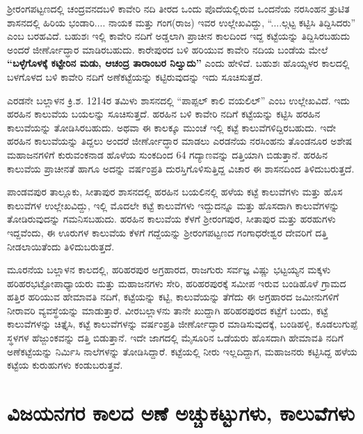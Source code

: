 ಶ‍್ರೀರಂಗಪಟ್ಟಣದಲ್ಲಿ ಚಂದ್ರವನದಬಳಿ ಕಾವೇರಿ ನದಿ ತೀರದ ಒಂದು ಪೊದೆಯಲ್ಲಿರುವ ಒಂದನೆಯ ನರಸಿಂಹನ ತ್ರುಟಿತ ಶಾಸನದಲ್ಲಿ ಹಿರಿಯ ಭಂಡಾರಿ.... ನಾಯಕ ಮತ್ತು ಗಂಗ(ರಾಜ) ಇವರ ಉಲ್ಲೇಖವಿದ್ದು, “....ಲ್ಗಟ್ಟ ಕಟ್ಟಿಸಿ ತಿದ್ದಿಸಿದರು” ಎಂಬ ಬರಹವಿದೆ. ಬಹುಶಃ ಇಲ್ಲಿ ಕಾವೇರಿ ನದಿಗೆ ಅಡ್ಡಲಾಗಿ ಪ್ರಾಚೀನ ಕಾಲದಿಂದ ಇದ್ದ ಕಟ್ಟೆಯನ್ನು ತಿದ್ದಿಸಿರಬಹುದು ಅಂದರೆ ಜೀರ್ಣೋದ್ಧಾರ ಮಾಡಿರಬಹುದು. ಕಾರೇಪುರದ ಬಳಿ ಹರಿಯುವ ಕಾವೇರಿ ನದಿಯ ಬಂಡೆಯ ಮೇಲೆ \textbf{“ಬಳ್ಳೆಗೊಳಕ್ಕೆ ಕಟ್ಟೇರಿನ ಮಡು, ಆಚಂದ್ರ ತಾರಾಂಬರ ನಿಲ್ವುದು”} ಎಂದು ಹೇಳಿದೆ. ಬಹುಶಃ ಹೊಯ್ಸಳರ ಕಾಲದಲ್ಲಿ ಬಳಗೊಳದ ಬಳಿ ಕಾವೇರಿ ನದಿಗೆ ಅಣೆಕಟ್ಟೆಯನ್ನು ಕಟ್ಟಿರುವುದನ್ನು ಇದು ಸೂಚಿಸುತ್ತದೆ.

ಎರಡನೇ ಬಲ್ಲಾಳನ ಕ್ರಿ.ಶ. 1214ರ ತಮಿಳು ಶಾಸನದಲ್ಲಿ “ಪಾಪ್ಪಲ್​ ಕಾಲಿ ವಯಲಿಲ್​” ಎಂಬ ಉಲ್ಲೇಖವಿದೆ. ಇದು ಹರಹಿನ ಕಾಲುವೆಯ ಬಯಲನ್ನು ಸೂಚಿಸುತ್ತದೆ. ಹರಹಿನ ಬಳಿ ಕಾವೇರಿ ನದಿಗೆ ಕಟ್ಟೆಯನ್ನು ಕಟ್ಟಿಸಿ ಹರಹಿನ ಕಾಲುವೆಯನ್ನು ತೋಡಿಸಿರಬಹುದು. ಅಥವಾ ಈ ಕಾಲಕ್ಕೂ ಮುಂಚೆ ಇಲ್ಲಿ ಕಟ್ಟೆ ಕಾಲುವೆಗಳಿದ್ದಿರಬಹುದು. ಇದೇ ಹರಹಿನ ಕಾಲುವೆಯನ್ನು ತಿದ್ದಲು ಅಂದರೆ ಜೀರ್ಣೋದ್ಧಾರ ಮಾಡಲು ಎರಡನೆಯ ನರಸಿಂಹನು ತೊಂಡನೂರ ಅಶೇಷ ಮಹಾಜನಗಳಿಗೆ ಕುರುವಂಕನಾಡ ಹೊಳೆಯ ಸುಂಕದಿಂದ 64 ಗದ್ಯಾಣವನ್ನು ದತ್ತಿಯಾಗಿ ಬಿಡುತ್ತಾನೆ. ಹರಹಿನ ಕಾಲುವೆಯ ಪ್ರಾಚೀನತೆ ಹಾಗೂ ಅದನ್ನು ವರ್ಷಂಪ್ರತಿ ದುರಸ್ತಿಗೊಳಿಸುತ್ತಿದ್ದ ವಿಚಾರ ಈ ಶಾಸನದಿಂದ ತಿಳಿದುಬರುತ್ತದೆ.

ಪಾಂಡವಪುರ ತಾಲ್ಲೂಕು, ಸೀತಾಪುರ ಶಾಸನದಲ್ಲಿ ಹರಹಿನ ಬಯಲಿನಲ್ಲಿ ಹಳೆಯ ಕಟ್ಟೆ ಕಾಲುವೆಗಳು ಮತ್ತು ಹೊಸ ಕಾಲುವೆಗಳ ಉಲ್ಲೇಖವಿದ್ದು, ಇಲ್ಲಿ ಮೊದಲೇ ಕಟ್ಟೆ ಕಾಲುವೆಗಳು ಇದ್ದುದನ್ನೂ ಮತ್ತು ಹೊಸದಾಗಿ ಕಾಲುವೆಗಳನ್ನು ತೋಡಿರುವುದನ್ನು ಗಮನಿಸಬಹುದು. ಹರಹಿನ ಕಾಲುವೆಯ ಕೆಳಗೆ ಶ‍್ರೀರಂಗಪುರ, ಸೀತಾಪುರ ಮತ್ತು ಹರಹುಗಳು ಇದ್ದವೆಂದು, ಈ ಊರುಗಳ ಕಾಲುವೆಯ ಕೆಳಗೆ ಗದ್ದೆಯನ್ನು ಶ‍್ರೀರಂಗಪಟ್ಟಣದ ಗಂಗಾಧರೇಶ್ವರ ದೇವರಿಗೆ ದತ್ತಿ ನೀಡಲಾಯಿತೆಂದು ತಿಳಿದುಬರುತ್ತದೆ.

ಮೂರನೆಯ ಬಲ್ಲಾಳನ ಕಾಲದಲ್ಲಿ, ಹರಿಹರಪುರ ಅಗ್ರಹಾರದ, ರಾಜಗುರು ಸರ್ವಜ್ಞ ವಿಷ್ಣು ಭಟ್ಟಯ್ಯನ ಮಕ್ಕಳು ಹರಿಹರಭಟ್ಟೋಪಾಧ್ಯಾಯರು ಮತ್ತು ಮಹಾಜನಗಳು ಸೇರಿ, ಹರಿಹರಪುರಕ್ಕೆ ಸಮೀಪ ಇರುವ ಬಂಡಿಹೊಳೆ ಗ್ರಾಮದ ಹತ್ತಿರ ಹರಿಯುವ ಹೇಮಾವತಿ ನದಿಗೆ, ಕಟ್ಟೆಯನ್ನು ಕಟ್ಟಿ, ಕಾಲುವೆಯನ್ನು ತೆಗೆದು ಈ ಅಗ್ರಹಾರದ ಜಮೀನುಗಳಿಗೆ ನೀರಾವರಿ ವ್ಯವಸ್ಥೆಯನ್ನು ಮಾಡುತ್ತಾರೆ. ವೀರಬಲ್ಲಾಳನು ತಾನೇ ಖುದ್ದಾಗಿ ಹರಿಹರಪುರದ ಕಟ್ಟೆಗೆ ಬಂದು, ಕಟ್ಟೆ ಕಾಲುವೆಗಳನ್ನು ಚಿತ್ತೈಸಿ, ಕಟ್ಟೆ ಕಾಲುವೆಗಳನ್ನು ವರ್ಷಂಪ್ರತಿ ಜೀರ್ಣೋದ್ಧಾರ ಮಾಡಿಸುವುದಕ್ಕೆ, ಬಂಡಿಹಳ್ಳಿ, ಕೂಡಲುಗುಪ್ಪೆ ಸ್ಥಳಗಳ ಹೆಜ್ಜುಂಕವನ್ನು ದತ್ತಿ ಬಿಡುತ್ತಾನೆ. ಇದೇ ಜಾಗದಲ್ಲಿ ಮೈಸೂರಿನ ಒಡೆಯರು ಹೊಸದಾಗಿ ಹೇಮಾವತಿ ನದಿಗೆ ಅಣೆಕಟ್ಟೆಯನ್ನು ನಿರ್ಮಿಸಿ ನಾಲೆಗಳನ್ನು ತೋಡಿಸಿದ್ದಾರೆ. ಕಟ್ಟೆಯಲ್ಲಿ ನೀರು ಇಲ್ಲದಿದ್ದಾಗ, ಮಹಾಜನರು ಕಟ್ಟಿಸಿದ್ದ ಹಳೆಯ ಕಟ್ಟೆಯ ಕುರುಹುಗಳು ಕಂಡುಬರುತ್ತವೆ.

\section*{ವಿಜಯನಗರ ಕಾಲದ ಅಣೆ ಅಚ್ಚುಕಟ್ಟುಗಳು, ಕಾಲುವೆಗಳು}

